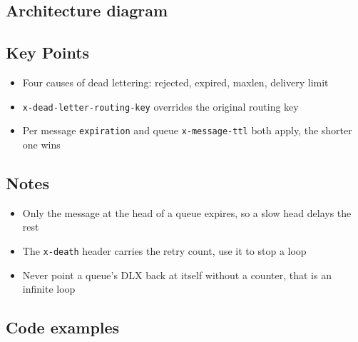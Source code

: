 \documentclass[11pt,a4paper]{article}
\begin{document}

\subsection{Architecture diagram}

\subsection*{Key Points}

\begin{itemize}\itemsep2pt
  \item Four causes of dead lettering: rejected, expired, maxlen, delivery limit
  \item \lstinline|x-dead-letter-routing-key| overrides the original routing key
  \item Per message \lstinline|expiration| and queue \lstinline|x-message-ttl| both apply,
        the shorter one wins
\end{itemize}

\subsection*{Notes}

\begin{itemize}\itemsep2pt
  \item Only the message at the head of a queue expires, so a slow head delays the rest
  \item The \lstinline|x-death| header carries the retry count, use it to stop a loop
  \item Never point a queue's DLX back at itself without a counter, that is an infinite loop
\end{itemize}

\newpage
\subsection{Code examples}
\end{document}
